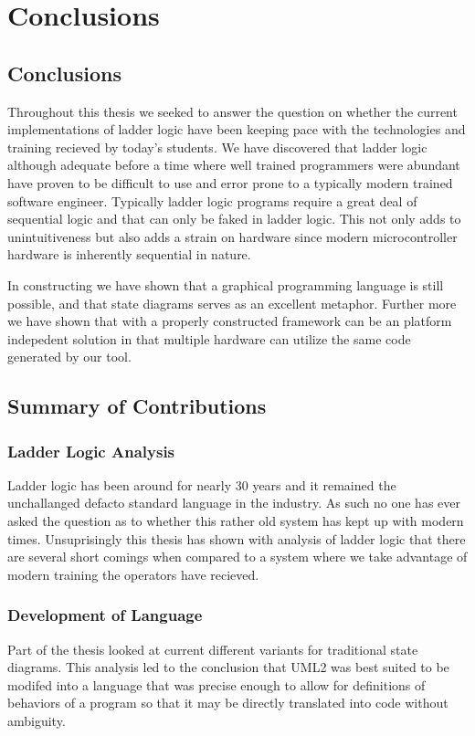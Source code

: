 \section{Conclusions}

\subsection{Conclusions}

Throughout this thesis we seeked to answer the question on whether the current implementations of ladder logic have been keeping pace with the technologies and training recieved by today's students. We have discovered that ladder logic although adequate before a time where well trained programmers were abundant have proven to be difficult to use and error prone to a typically modern trained software engineer. Typically ladder logic programs require a great deal of sequential logic and that can only be faked in ladder logic. This not only adds to unintuitiveness but also adds a strain on hardware since modern microcontroller hardware is inherently sequential in nature.

In constructing \plccharts we have shown that a graphical programming language is still possible, and that state diagrams serves as an excellent metaphor. Further more we have shown that with a properly constructed framework \plccharts can be an platform indepedent solution in that multiple hardware can utilize the same  code generated by our tool. 


\subsection{Summary of Contributions}

\subsubsection{Ladder Logic Analysis}
Ladder logic has been around for nearly 30 years and it remained the unchallanged defacto standard language in the industry. As such no one has ever asked the question as to whether this rather old system has kept up with modern times. Unsuprisingly this thesis has shown with analysis of ladder logic that there are several short comings when compared to a system where we take advantage of modern training the operators have recieved. 


\subsubsection{Development of \plccharts Language}
Part of the thesis looked at current different variants for traditional state diagrams. This analysis led to the conclusion that UML2 was best suited to be modifed into a language that was precise enough to allow for definitions of behaviors of a program so that it may be directly translated into code without ambiguity.

